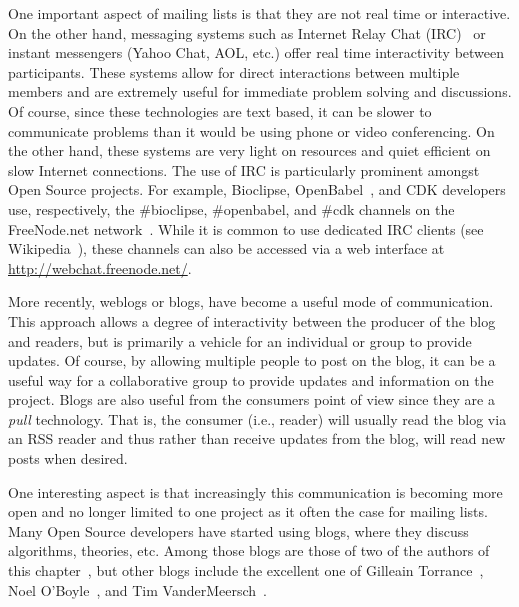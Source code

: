 \documentclass[11pt]{book}
\begin{document}
One important aspect of mailing lists is that they are not real time
or interactive. On the other hand, messaging systems such as Internet
Relay Chat (IRC)~\cite{rfc1459} or instant messengers (Yahoo Chat, AOL, etc.) offer
real time interactivity between participants. These systems allow for
direct interactions between multiple members and are extremely useful
for immediate problem solving and discussions. Of course, since these
technologies are text based, it can be slower to communicate
problems than it would be using phone or video
conferencing. On the other hand, these systems are very light on
resources and quiet efficient on slow Internet connections. The use of
IRC is particularly prominent amongst Open Source projects. For
example, Bioclipse, OpenBabel~\cite{url:openbabel}, and CDK developers use, respectively,
the \#bioclipse, \#openbabel, and \#cdk channels on the
FreeNode.net network~\cite{url:freenode}. While it is common to use
dedicated IRC clients (see Wikipedia~\cite{wp:ircclients}),
these channels can also be accessed via a web interface at
\url{http://webchat.freenode.net/}.

More recently, weblogs or blogs, have become a useful mode of
communication. This approach allows a degree of interactivity between
the producer of the blog and readers, but is primarily a vehicle for
an individual or group to provide updates. Of course, by allowing
multiple people to post on the blog, it can be a useful way for a
collaborative group to provide updates and information on the
project. Blogs are also useful from the consumers point of view since
they are a \emph{pull} technology. That is, the consumer (i.e.,
reader) will usually read the blog via an RSS reader and thus rather
than receive updates from the blog, will read new posts when desired.

One interesting aspect is that increasingly this communication
is becoming more open and no longer limited to one project as
it often the case for mailing lists. Many Open Source developers
have started using blogs, where they discuss algorithms, theories,
etc. Among those blogs are those of two of the authors of this
chapter~\cite{blog:rguha,blog:egonw},
but other blogs include the excellent one of
Gilleain Torrance~\cite{blog:gilleain},
Noel O'Boyle~\cite{blog:noel}, and
Tim VanderMeersch~\cite{blog:tim}.
\end{document}
